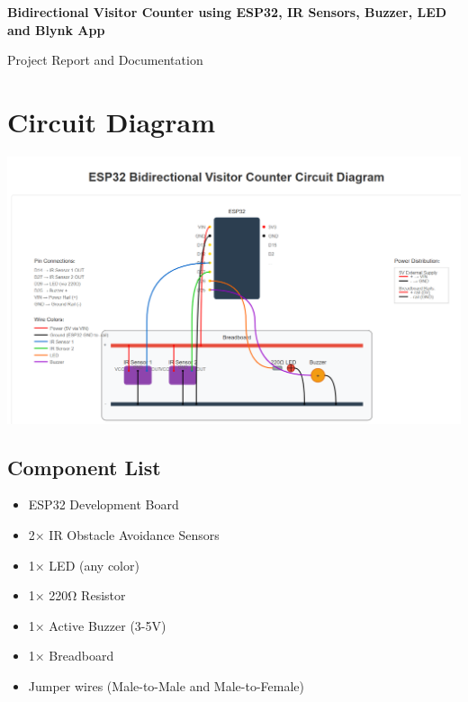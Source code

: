\documentclass[12pt,a4paper]{article}
\begin{document}
\begin{center}
    \LARGE \textbf{Bidirectional Visitor Counter using ESP32, IR Sensors, Buzzer, LED and Blynk App}
    
    \large Project Report and Documentation
\end{center}

\vspace{1cm}

\section{Circuit Diagram}

\begin{center}
    \includegraphics[width=1\textwidth]{diagram.png}
\end{center}


\subsection{Component List}
\begin{itemize}[leftmargin=*]
    \item ESP32 Development Board
    \item 2× IR Obstacle Avoidance Sensors
    \item 1× LED (any color)
    \item 1× 220Ω Resistor
    \item 1× Active Buzzer (3-5V)
    \item 1× Breadboard
    \item Jumper wires (Male-to-Male and Male-to-Female)
\end{itemize}
\newpage
\end{document}
